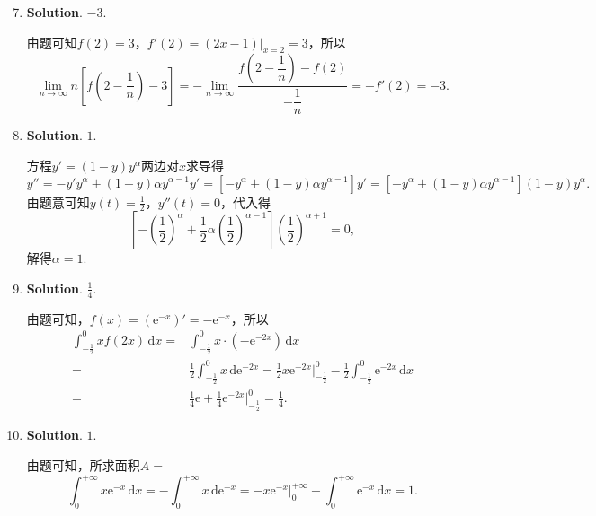 \documentclass[../main.tex]{subfiles}
\begin{document}
\begin{enumerate}
    \setcounter{enumi}{6}
    \item \textbf{Solution}. $-3$.

          由题可知$f(2)=3$，$f'(2)=(2x-1)\bigg|_{x=2}=3$，所以
          \[
              \lim_{n\to\infty}n\left[f\left(2-\frac{1}{n}\right)-3\right] = -\lim_{n\to\infty}
              \frac{f\left(2-\dfrac{1}{n}\right)-f(2)}{-\dfrac{1}{n}}= -f'(2) = -3.
          \]

    \item \textbf{Solution}. $1$.

          方程$y'=(1-y)y^{\alpha}$两边对$x$求导得
          \[
              y''=-y'y^{\alpha}+(1-y)\alpha y^{\alpha-1}y'=\left[-y^{\alpha}+(1-y)\alpha
                  y^{\alpha-1}\right]y'=\left[-y^{\alpha}+(1-y)\alpha y^{\alpha-1}\right](1
              -y)y^{\alpha}.
          \]
          由题意可知$y(t)=\frac{1}{2}$，$y''(t)=0$，代入得
          \[
              \left[-\left(\frac{1}{2}\right
                  )^{\alpha}+\frac{1}{2}\alpha \left(\frac{1}{2}\right)^{\alpha-1}\right]\left
              (\frac{1}{2}\right)^{\alpha+1}=0,
          \]
          解得$\alpha=1$.

    \item \textbf{Solution}. $\frac{1}{4}$.

          由题可知，$f(x)=\left(\mathrm{e}^{-x}\right)'=-\mathrm{e}^{-x}$，所以
          \[
              \begin{aligned}
                  \int_{-\frac{1}{2}}^{0}xf(2x)\,\mathrm{d}x = {} & \int_{-\frac{1}{2}}^{0}x\cdot\left(-\mathrm{e}^{-2x}\right)\,\mathrm{d}x                                                                                                               \\
                  = {}                                            & \frac{1}{2}\int_{-\frac{1}{2}}^{0}x\,\mathrm{d}\mathrm{e}^{-2x}= \frac{1}{2}x\mathrm{e}^{-2x}\bigg|_{-\frac{1}{2}}^{0}-\frac{1}{2}\int_{-\frac{1}{2}}^{0}\mathrm{e}^{-2x}\,\mathrm{d}x \\
                  = {}                                            & \frac{1}{4}\mathrm{e}+\frac{1}{4}\mathrm{e}^{-2x}\bigg|_{-\frac{1}{2}}^{0}= \frac{1}{4}.
              \end{aligned}
          \]

    \item \textbf{Solution}. $1$.

          由题可知，所求面积$A=$
          \[
              \int_{0}^{+\infty}x\mathrm{e}^{-x}\,\mathrm{d}x = -\int_{0}^{+\infty}x\,\mathrm{d}
              \mathrm{e}^{-x}= -x\mathrm{e}^{-x}\bigg|_{0}^{+\infty}+\int_{0}^{+\infty}
              \mathrm{e}^{-x}\,\mathrm{d}x = 1.
          \]
\end{enumerate}
\end{document}
